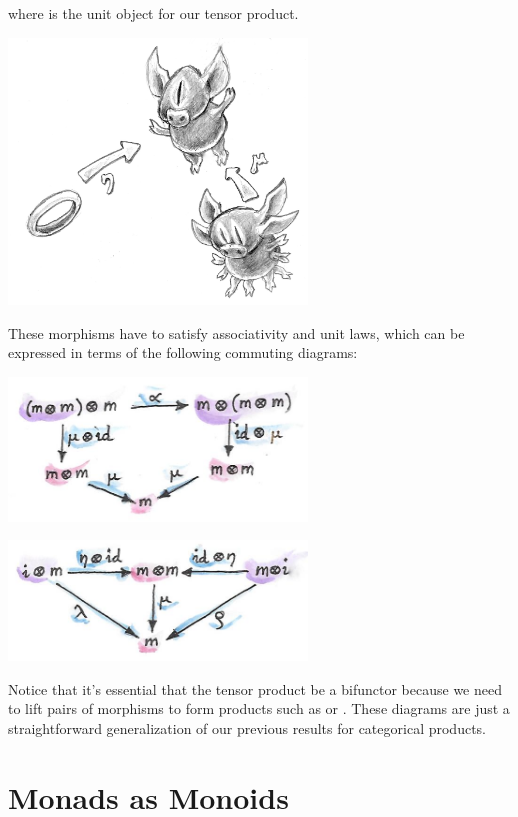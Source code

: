 where  is the unit object for our tensor product.

\includegraphics[width=3.12500in]{images/monoid-1.jpg}

These morphisms have to satisfy associativity and unit laws, which can
be expressed in terms of the following commuting diagrams:

\includegraphics[width=3.12500in]{images/assoctensor.jpg}

\includegraphics[width=3.12500in]{images/unitmon.jpg}

Notice that it's essential that the tensor product be a bifunctor
because we need to lift pairs of morphisms to form products such as
 or . These diagrams are just a
straightforward generalization of our previous results for categorical
products.

\section{Monads as Monoids}\label{monads-as-monoids}

